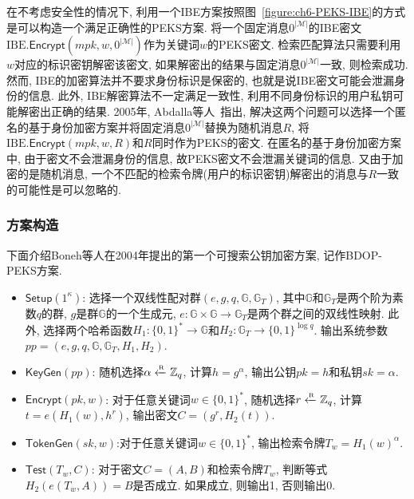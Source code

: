 \begin{note}
在不考虑安全性的情况下, 利用一个IBE方案按照图~\ref{figure:ch6-PEKS-IBE}的方式是可以构造一个满足正确性的PEKS方案. 将一个固定消息$0^{|\mathcal{M}|}$的IBE密文$\text{IBE}.\mathsf{Encrypt}(mpk, w, 0^{|\mathcal{M}|})$作为关键词$w$的PEKS密文. 检索匹配算法只需要利用$w$对应的标识密钥解密该密文, 如果解密出的结果与固定消息$0^{|\mathcal{M}|}$一致, 则检索成功. 然而, IBE的加密算法并不要求身份标识是保密的, 也就是说IBE密文可能会泄漏身份的信息. 此外, IBE解密算法不一定满足一致性, 利用不同身份标识的用户私钥可能解密出正确的结果. 2005年, Abdalla等人~\cite{Abdalla2005}指出, 解决这两个问题可以选择一个匿名的基于身份加密方案并将固定消息$0^{|\mathcal{M}|}$替换为随机消息$R$, 将$\text{IBE}.\mathsf{Encrypt}(mpk, w, R)$和$R$同时作为PEKS的密文. 在匿名的基于身份加密方案中, 由于密文不会泄漏身份的信息, 故PEKS密文不会泄漏关键词的信息. 又由于加密的是随机消息, 一个不匹配的检索令牌(用户的标识密钥)解密出的消息与$R$一致的可能性是可以忽略的.
\end{note}


\subsubsection{方案构造}
下面介绍Boneh等人在2004年提出的第一个可搜索公钥加密方案, 记作BDOP-PEKS方案. 
\begin{construction}
\begin{itemize}
\item $\mathsf{Setup}(1^\kappa)$: 选择一个双线性配对群$(e, g, q, \mathbb{G}, \mathbb{G}_T)$, 其中$\mathbb{G}$和$\mathbb{G}_T$是两个阶为素数$q$的群, $g$是群$\mathbb{G}$的一个生成元, $e: \mathbb{G} \times \mathbb{G} \rightarrow \mathbb{G}_T$是两个群之间的双线性映射. 此外, 选择两个哈希函数$H_1: \{0, 1\}^* \rightarrow \mathbb{G}$和$H_2: \mathbb{G}_T \rightarrow \{0, 1\}^{\log q}$. 输出系统参数$pp = (e, g, q, \mathbb{G}, \mathbb{G}_T, H_1, H_2)$.

\item $\mathsf{KeyGen}(pp)$: 随机选择$\alpha \xleftarrow{\textup{\tiny R}} \mathbb{Z}_q$, 计算$h = g^{\alpha}$, 输出公钥$pk = h$和私钥$sk = \alpha$.

\item $\mathsf{Encrypt}(pk, w)$: 对于任意关键词$w \in \{0, 1\}^*$, 随机选择$r \xleftarrow{\textup{\tiny R}} \mathbb{Z}_q$, 计算$t = e(H_1(w), h^r)$, 输出密文$C = (g^r, H_2(t))$.

\item $\mathsf{TokenGen}(sk, w)$:对于任意关键词$w \in \{0, 1\}^*$, 输出检索令牌$T_w =  H_1(w)^\alpha$.

\item $\mathsf{Test}(T_w, C)$: 对于密文$C = (A, B)$和检索令牌$T_w$, 判断等式$H_2(e(T_w, A)) = B$是否成立. 如果成立, 则输出1, 否则输出0.
\end{itemize}
\end{construction}

